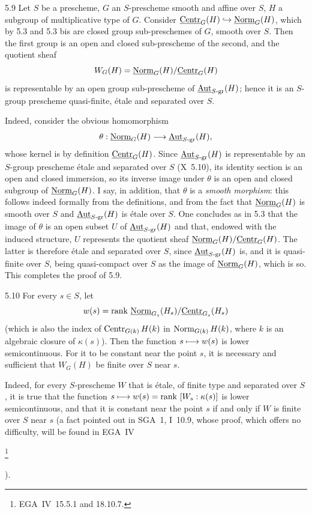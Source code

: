 \begin{proposition}{5.9}\label{XI.5.9}
Let $S$ be a prescheme, $G$ an $S$-prescheme smooth and affine over $S$, $H$ a subgroup of multiplicative type of $G$. Consider $\underline{\mathrm{Centr}}_G(H)\hookrightarrow\underline{\mathrm{Norm}}_G(H)$, which by 5.3 and 5.3 bis are closed group sub-preschemes of $G$, smooth over $S$. Then the first group is an open and closed sub-prescheme of the second, and the quotient sheaf
\[
W_G(H)=\underline{\mathrm{Norm}}_G(H)/\underline{\mathrm{Centr}}_G(H)
\]
is representable by an open group sub-prescheme of $\underline{\operatorname{Aut}}_{S\text{-gr}}(H)$; hence it is an $S$-group prescheme quasi-finite, étale and separated over $S$.
\end{proposition}
Indeed, consider the obvious homomorphism
\[
\theta:\underline{\mathrm{Norm}}_G(H)\longrightarrow\underline{\operatorname{Aut}}_{S\text{-gr}}(H),
\]
whose kernel is by definition $\underline{\mathrm{Centr}}_G(H)$. Since $\underline{\operatorname{Aut}}_{S\text{-gr}}(H)$ is representable by an $S$-group prescheme étale and separated over $S$ (X~5.10), its identity section is an open and closed immersion, so its inverse image under $\theta$ is an open and closed subgroup of $\underline{\mathrm{Norm}}_G(H)$. I say, in addition, that $\theta$ is a \emph{smooth morphism}: this follows indeed formally from the definitions, and from the fact that $\underline{\mathrm{Norm}}_G(H)$ is smooth over $S$ and $\underline{\operatorname{Aut}}_{S\text{-gr}}(H)$ is étale over $S$. One concludes as in 5.3 that the image of $\theta$ is an open subset $U$ of $\underline{\operatorname{Aut}}_{S\text{-gr}}(H)$ and that, endowed with the induced structure, $U$ represents the quotient sheaf $\underline{\mathrm{Norm}}_G(H)/\underline{\mathrm{Centr}}_G(H)$. The latter is therefore étale and separated over $S$, since $\underline{\operatorname{Aut}}_{S\text{-gr}}(H)$ is, and it is quasi-finite over $S$, being quasi-compact over $S$ as the image of $\underline{\mathrm{Norm}}_G(H)$, which is so. This completes the proof of 5.9.
\begin{corollary}{5.10}\label{XI.5.10}
For every $s\in S$, let
\[
w(s)=\text{rank }\underline{\mathrm{Norm}}_{G_s}(H_s)/\underline{\mathrm{Centr}}_{G_s}(H_s)
\]
(which is also the index of $\operatorname{Centr}_{G(k)}H(k)$ in $\operatorname{Norm}_{G(k)}H(k)$, where $k$ is an algebraic closure of $\kappa(s)$). Then the function $s\longmapsto w(s)$ is lower semicontinuous. For it to be constant near the point $s$, it is necessary and sufficient that $W_G(H)$ be finite over $S$ near $s$.
\end{corollary}
Indeed, for every $S$-prescheme $W$ that is étale, of finite type and separated over $S$, it is true that the function $s\longmapsto w(s)=\text{rank }[W_s:\kappa(s)]$ is lower semicontinuous, and that it is constant near the point $s$ if and only if $W$ is finite over $S$ near $s$ (a fact pointed out in SGA~1, I~10.9, whose proof, which offers no difficulty, will be found in EGA~IV{\renewcommand{\thefootnote}{*}\footnote{EGA~IV~15.5.1 and 18.10.7.}\addtocounter{footnote}{-1}}).
